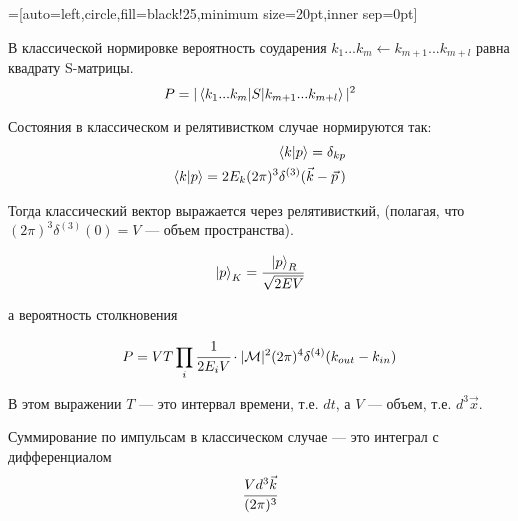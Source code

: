 =[auto=left,circle,fill=black!25,minimum size=20pt,inner sep=0pt]

В классической нормировке вероятность соударения $k_1 ... k_m \leftarrow k_{m+1} ... k_{m+l}$ равна квадрату S-матрицы.
\begin{equation*}
	P = | \mel{k_1 ... k_m}{S}{k_{m+1} ... k_{m+l}}|^2
\end{equation*}

Состояния в классическом и релятивистком случае нормируются так:
\begin{align*}
	\bra{k}\ket{p} = \delta_{kp}\\
	\bra{k}\ket{p} = 2E_k (2\pi)^3 \delta^{(3)}(\vec{k}-\vec{p} \,)
\end{align*}

Тогда классический вектор выражается через релятивисткий, (полагая, что $(2\pi)^3 \delta^{(3)}(0) = V$ --- объем пространства).

\begin{equation*}
	\ket{p}_K =\cfrac{ \ket{p}_R}{\sqrt{2EV}}
\end{equation*}

а вероятность столкновения

\begin{equation*}
	P = VT \prod_{i} \cfrac{1}{2 E_i V} \cdot |\mathcal{M}|^2 (2\pi)^4 
	\delta^{(4)}(k_{out} - k_{in})
\end{equation*}

В этом выражении $T$ --- это интервал времени, т.е. $dt$, а $V$ --- объем, т.е. $d^3\vec{x}$.

Суммирование по импульсам в классическом случае --- это интеграл с дифференциалом
\[
	\cfrac{Vd^3\vec{k}}{(2\pi)^3}
\]

